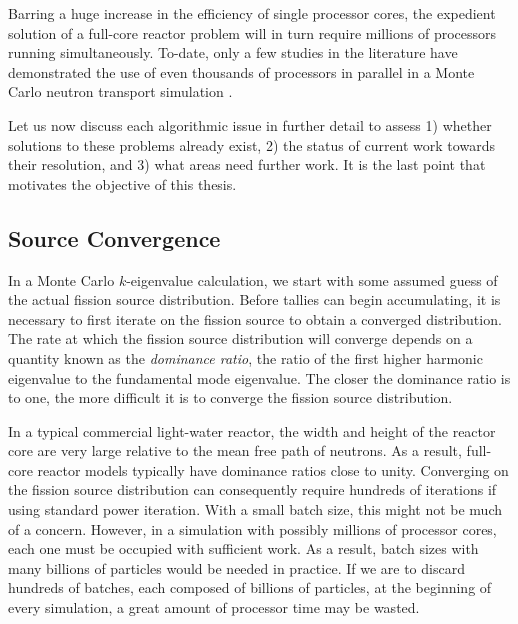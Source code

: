 Barring a huge increase in the efficiency of single processor cores, the
expedient solution of a full-core reactor problem will in turn require millions
of processors running simultaneously. To-date, only a few studies in the
literature have demonstrated the use of even thousands of processors in parallel
in a Monte Carlo neutron transport simulation \cite{lanl-brown-2005,
  ane-romano-2013}.

Let us now discuss each algorithmic issue in further detail to assess 1) whether
solutions to these problems already exist, 2) the status of current work towards
their resolution, and 3) what areas need further work. It is the last point that
motivates the objective of this thesis. 

\subsection{Source Convergence}

In a Monte Carlo $k$-eigenvalue calculation, we start with some assumed guess of
the actual fission source distribution. Before tallies can begin accumulating,
it is necessary to first iterate on the fission source to obtain a converged
distribution. The rate at which the fission source distribution will converge
depends on a quantity known as the \emph{dominance ratio}, the ratio of the
first higher harmonic eigenvalue to the fundamental mode eigenvalue. The closer
the dominance ratio is to one, the more difficult it is to converge the fission
source distribution.

In a typical commercial light-water reactor, the width and height of the reactor
core are very large relative to the mean free path of neutrons. As a result,
full-core reactor models typically have dominance ratios close to
unity. Converging on the fission source distribution can consequently require
hundreds of iterations if using standard power iteration. With a small batch
size, this might not be much of a concern. However, in a simulation with
possibly millions of processor cores, each one must be occupied with sufficient
work. As a result, batch sizes with many billions of particles would be needed
in practice. If we are to discard hundreds of batches, each composed of billions
of particles, at the beginning of every simulation, a great amount of processor
time may be wasted.

